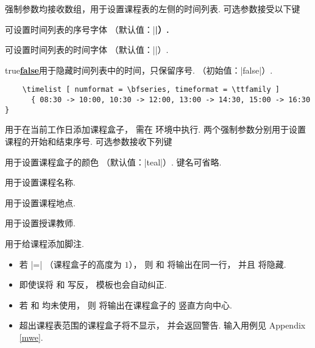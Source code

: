 \documentclass[svgnames]{l3doc}
\def \TFF {true\textup{\textbar\underline{\textbf{false}}}}
\begin{document}
\begin{documentation}
\begin{function}{\timelist}
  \begin{syntax}
       
  \end{syntax}
  强制参数均接收数组，用于设置课程表的左侧的时间列表.
  可选参数接受以下键
  \begin{keyval}
    \item [\key{numformat}] 
    可设置时间列表的序号字体
    （默认值：|\ttfamily \bfseries|）.
    \item [\key{timefont}]  可设置时间列表的时间字体
    （默认值：|\ttfamily|）.
    \item [\key{hidetime}] \val\TFF 用于隐藏时间列表中的时间，只保留序号.
    （初始值：|false|）.
  \end{keyval}
  \begin{verbatim}
    \timelist [ numformat = \bfseries, timeformat = \ttfamily ]
      { 08:30 -> 10:00, 10:30 -> 12:00, 13:00 -> 14:30, 15:00 -> 16:30 }
  \end{verbatim}
\end{function}

\begin{function}{\course}
  \begin{syntax}
         
  \end{syntax}
  用于在当前工作日添加课程盒子，
  需在  环境中执行.
  两个强制参数分别用于设置课程的开始和结束序号.
  可选参数接收下列键
  \begin{keyval}
    \item [\key{color}]  用于设置课程盒子的颜色
    （默认值：|teal|）. 键名可省略.
    \item [\key{subject}]  用于设置课程名称.
    \item [\key{location}]  用于设置课程地点.
    \item [\key{lecture}]  用于设置授课教师.
    \item [\key{comment}]  用于给课程添加脚注.
  \end{keyval}
  \begin{texnote}
    \begin{itemize}[leftmargin = 2em]
      \item 若  |=| （课程盒子的高度为 $1$），
      则  和  将输出在同一行，
      并且  将隐藏.
      \item 即使误将  和  写反，
      模板也会自动纠正.
      \item 若  和  均未使用，
      则  将输出在课程盒子的
      竖直方向中心.
      \item 超出课程表范围的课程盒子将不显示，
      并会返回警告.
      输入用例见 Appendix \ref{mwe}.
    \end{itemize}
  \end{texnote}
\end{function}


\end{documentation}
\end{document}
